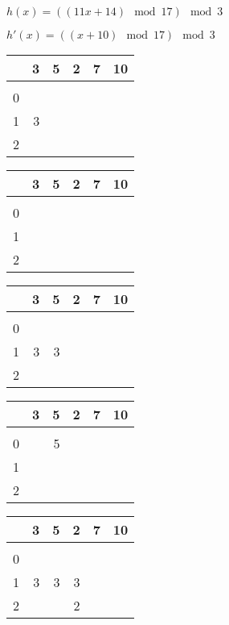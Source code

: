 \documentclass[a4paper, fontsize=10pt]{scrartcl}
\begin{document}
\begin{center}

    \begin{multicols}{2}
    $h(x)=((11x+14)\mod 17)\mod 3$\smallskip
   \vfill
   \columnbreak
   
    $h'(x)=((x+10)\mod 17)\mod 3$\smallskip
    
  \end{multicols}
  
  \begin{multicols}{2}
    \begin{tabular}{r|rrrrr}
      &3 & 5 & 2 & 7 & 10\\
      \hline\\
      0 \\
      1 &3\\
      2 \\
    \end{tabular}
  \bigskip

    \begin{tabular}{r|rrrrr}
      &3 & 5 & 2 & 7 & 10\\
      \hline\\
      0 \\
      1 \\
      2 \\
    \end{tabular}
  \end{multicols}
  
    \begin{multicols}{2}
    \begin{tabular}{r|rrrrr}
      &3 & 5 & 2 & 7 & 10\\
      \hline\\
      0 \\
      1 &3&3\\
      2 \\
    \end{tabular}
  \bigskip

    \begin{tabular}{r|rrrrr}
      &3 & 5 & 2 & 7 & 10\\
      \hline\\
      0 & & 5\\
      1 \\
      2 \\
    \end{tabular}
  \end{multicols}
  
     \begin{multicols}{2}
    \begin{tabular}{r|rrrrr}
      &3 & 5 & 2 & 7 & 10\\
      \hline\\
      0 \\
      1 &3&3&3\\
      2 &&&2
    \end{tabular}
  \bigskip


\end{multicols}
\end{center}
\end{document}
